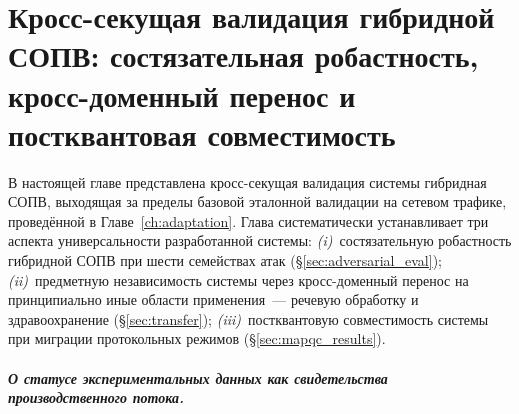 
\chapter{Кросс-секущая валидация гибридной СОПВ: состязательная робастность, кросс-доменный перенос и постквантовая совместимость}
\label{ch:experiments}

В настоящей главе представлена кросс-секущая валидация системы
гибридная СОПВ, выходящая за пределы базовой эталонной валидации на
сетевом трафике, проведённой в Главе~\ref{ch:adaptation}. Глава
систематически устанавливает три аспекта универсальности
разработанной системы: \emph{(i)}~состязательную робастность
гибридной СОПВ при шести семействах атак
(\S\ref{sec:adversarial_eval}); \emph{(ii)}~предметную независимость
системы через кросс-доменный перенос на принципиально иные области
применения~--- речевую обработку и здравоохранение
(\S\ref{sec:transfer}); \emph{(iii)}~постквантовую совместимость
системы при миграции протокольных режимов
(\S\ref{sec:mapqc_results}).

\paragraph{О статусе экспериментальных данных как
свидетельства производственного потока.}

